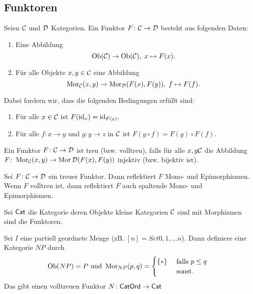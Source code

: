 \subsection{Funktoren}
\begin{Def}[Funktor]
    Seien $\mathcal{C}$ und $\mathcal{D}$ Kategorien. Ein Funktor $F\colon\mathcal{C}\to\mathcal{D}$ besteht aus folgenden Daten:
    \begin{enumerate}
        \item Eine Abbildung $$\operatorname{Ob}(\mathcal{C})\to\operatorname{Ob}(\mathcal{C}),\; x\mapsto F(x).$$
        \item Für alle Objekte $x,y\in\mathcal{C}$ eine Abbildung 
        $$\operatorname{Mor}_{\mathcal{C}}(x,y)\to\operatorname{Mor}_{\mathcal{D}}(F(x),F(y)),\; f\mapsto F(f).$$
    \end{enumerate} Dabei fordern wir, dass die folgenden Bedingungen erfüllt sind:
    \begin{enumerate}
        \item Für alle $x\in\mathcal{C}$ ist $F(\mathrm{id}_x)=\mathrm{id}_{F(x)}.$
        \item Für alle $f\colon x\to y$ und $g\colon y\to z$ in $\mathcal{C}$ ist $F(g\circ f)=F(g)\circ F(f).$
    \end{enumerate}
    Ein Funktor $F\colon\mathcal{C}\to\mathcal{D}$ ist treu (bzw. volltreu), falls für alle $x,y\mathcal{C}$ die Abbildung $F\colon\operatorname{Mor}_{\mathcal{C}}(x,y)\to\operatorname{Mor}\mathcal{D}(F(x),F(y))$  injektiv (bzw. bijektiv ist).
\end{Def}
\begin{Bem}
    Sei $F\colon\mathcal{C}\to \mathcal{D}$ ein treuer Funktor. Dann reflektiert $F$ Mono- und Epimorphismen. Wenn $F$ volltreu ist, dann reflektiert $F$ auch spaltende Mono- und Epimorphismen.
\end{Bem}
\begin{Def}
    Sei $\mathsf{Cat}$ die Kategorie deren Objekte kleine Kategorien $\mathcal{C}$ sind mit Morphismen sind die Funktoren.
\end{Def}
\begin{Def}
    Sei $I$ eine partiell geordnete Menge (zB. $[n]=Set{0,1,\dots n}$). Dann definiere eine Kategorie $N P$ durch $$\ob(N P)=P\text{ und } \Mor_{N P}(p,q)=\begin{cases}
        \Set{*} & \text{ falls } p\leq q\\
        \empty & \text{ sonst.}
    \end{cases}$$
    Das gibt einen volltreuen Funktor $N\colon \mathsf{CatOrd}\to\mathsf{Cat}$ 
\end{Def}
